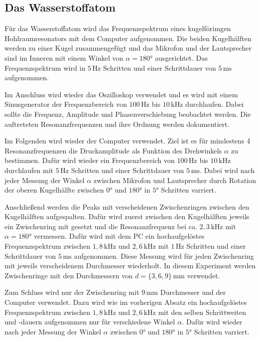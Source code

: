 \subsection{Das Wasserstoffatom}
\label{sec:d_H}

Für das Wasserstoffatom wird das Frequenzspektrum eines kugelförimgen Hohlraumresonators mit dem Computer aufgenommen. Die beiden Kugelhälften werden zu einer Kugel zusammengefügt und das Mikrofon und der Lautsprecher sind im Inneren mit einem Winkel von $\alpha = 180°$ ausgerichtet. Das Frequenzspektrum wird in $5 \, \mathrm{Hz}$ Schritten und einer Schrittdauer von $5 \, \mathrm{ms}$ aufgenommen. \newline

Im Anschluss wird wieder das Oszilloskop verwendet und es wird mit einem Sinusgenerator der Frequenzbereich von $100 \, \mathrm{Hz}$ bis $10 \, \mathrm{kHz}$ durchlaufen. Dabei sollte die Frequenz, Amplitude und Phasenverschiebung beobachtet werden. Die auftreteten Resonanzfrequenzen und ihre Ordnung werden dokumentiert. \newline

Im Folgenden wird wieder der Computer verwendet. Ziel ist es für mindestens 4 Resonanzfrequenzen die Druckamplitude als Funktion des Drehwinkels $\alpha$ zu bestimmen. Dafür wird wieder ein Frequenzbereich von $100 \, \mathrm{Hz}$ bis $10 \, \mathrm{kHz}$ durchlaufen mit $5 \, \mathrm{Hz}$ Schritten und einer Schrittdauer von $5 \, \mathrm{ms}$. Dabei wird nach jeder Messung der Winkel $\alpha$ zwischen Mikrofon und Lautsprecher durch Rotation der oberen Kugelhälfte zwischen $0°$ und $180°$ in $5°$ Schritten varriert. \newline

Anschließend werden die Peaks mit verscheidenen Zwischenringen zwischen den Kugelhälften aufgespalten. Dafür wird zuerst zwischen den Kugelhälften jeweils ein Zwischenring mit gesetzt und die Resonanzfrequenz bei ca. $2, \! 3 \, \mathrm{kHz}$ mit $\alpha = 180°$ vermessen. Dafür wird mit dem PC ein hochaufgelöstes Frequenzspektrum zwischen $1, \! 8 \, \mathrm{kHz}$ und $2, \! 6 \, \mathrm{kHz}$ mit $1 \, \mathrm{Hz}$ Schritten und einer Schrittdauer von $5 \, \mathrm{ms}$ aufgenommen. Diese Messung wird für jeden Zwischenring mit jeweils verscheidenem Durchmesser wiederholt. In diesem Experiment werden Zwischenringe mit den Durchmessern von $d = \{ 3, 6, 9 \} \, \mathrm{mm}$ verwendet. \newline

Zum Schluss wird nur der Zwischenring mit $9 \, \mathrm{mm}$ Durchmesser und der Computer verwendet. Dazu wird wie im vorherigen Absatz ein hochaufgelöstes Frequenzspektrum zwischen $1, \! 8 \, \mathrm{kHz}$ und $2, \! 6 \, \mathrm{kHz}$ mit den selben Schrittweiten und -dauern aufgenommen nur für verschiedene Winkel $\alpha$. Dafür wird wieder nach jeder Messung der Winkel $\alpha$ zwischen $0°$ und $180°$ in $5°$ Schritten varriert.

